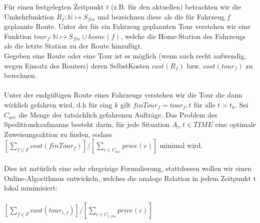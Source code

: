 \documentclass{article}
\begin{document}
Für einen festgelegten Zeitpunkt $t$ (z.B. für den aktuellen) betrachten wir die Umkehrfunktion $R_f:\mathbb{N} \mapsto S_{fin}$ und bezeichnen diese als die für Fahrzeug $f$ geplannte Route.
Unter der für ein Fahrzeug geplannten Tour verstehen wir eine Funktion $tour_f: \mathbb{N} \mapsto S_{fin} \cup home(f)$, welche die Home-Station des Fahrzeugs als die letzte Station zu der Route hinzufügt.
\\
Gegeben eine Route oder eine Tour ist es möglich (wenn auch recht aufwendig, wegen Einsatz des Routers) deren SelbstKosten $cost(R_f)$ bzw. $cost(tour_f)$ zu berechnen.
\\
 \\
Unter der endgültigen Route eines Fahrzeugs verstehen wir die Tour die dann wirklich gefahren wird, d.h für eing $k$ gilt $finTour_f = tour_f,t$ für alle $t > t_k$.
Sei $C_{acc}$ die Menge der tatsächlich gefahrenen Aufträge.
Das Problem des Speditionskaufmanns besteht darin, für jede Situation $A_t, t \in TIME$ eine optimale Zuweisungsaktion zu finden, sodass\\
 $[\sum_{f \in F} cost(finTour_f)] / [\sum_{c \in C_{acc}} price(c)]$ minimal wird.\\
 \\
 Dies ist natürlich eine sehr ehrgeizige Formulierung, stattdessen wollen wir einen Online-Algorithmus entwickeln, welches die analoge Relation in jedem Zeitpunkt t lokal minimisiert:\\
 \\
 $[\sum_{f \in F} cost(tour_{t,f})] / [\sum_{c \in C_{t,fin}} price(c)]$
\\
\\
\end{document}
